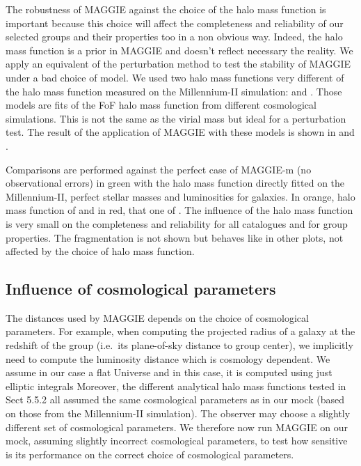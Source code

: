 The robustness of MAGGIE against the choice of the halo mass function is
important because this choice will affect the completeness and reliability of
our selected groups and their properties too in a non obvious way. Indeed, the
halo mass function is a prior in MAGGIE and doesn't reflect necessary the
reality. We apply an equivalent of the perturbation method to test the
stability of MAGGIE under a bad choice of model. We used two halo mass
functions very different of the halo mass function measured on the
Millennium-II simulation: \citet{Warren+06} and \citet{Courtin+11}. Those
models are fits of the FoF halo mass function from different cosmological
simulations. This is not the same as the virial mass but ideal for a
perturbation test. The result of the application of MAGGIE with these models is
shown in  and .

Comparisons are performed against the perfect case of MAGGIE-m (no
observational errors) in green with the halo mass function directly fitted on
the Millennium-II, perfect stellar masses and luminosities for galaxies. In
orange, halo mass function of \citet{Warren+06} and in red, that one of
\citet{Courtin+11}. The influence of the halo mass function is very small on
the completeness and reliability for all catalogues and for group properties.
The fragmentation is not shown but behaves like in other plots, not affected by
the choice of halo mass function.

\subsection{Influence of cosmological parameters}

The distances used by MAGGIE depends on the choice of cosmological parameters.
For example, when computing the projected radius of a galaxy at the redshift of
the group (i.e.\ its plane-of-sky distance to group center), we implicitly need
to compute the luminosity distance which is cosmology dependent. We assume in
our case a flat Universe and in this case, it is computed using just elliptic
integrals \citep{Liu+11,Eisenstein+97} Moreover, the different analytical halo
mass functions tested in Sect 5.5.2 all assumed the same cosmological
parameters as in our mock (based on those from the Millennium-II simulation).
The observer may choose a slightly different set of cosmological parameters. We
therefore now run MAGGIE on our mock, assuming slightly incorrect cosmological
parameters, to test how sensitive is its performance on the correct choice of
cosmological parameters.

